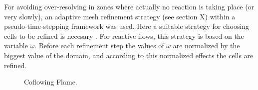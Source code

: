 {For avoiding over-resolving in zones where actually no reaction is taking place (or very slowly), an adaptive mesh refinement strategy  (see section X) within a pseudo-time-stepping framework was used.  Here a  suitable strategy for choosing cells to be refined is necesary . For reactive flows, this strategy is based on the variable $\omega$.
Before each refinement step the values of $\omega$ are normalized by the biggest value of the domain, and according to this normalized effects the cells are refined. %


\begin{figure}
	\centering
	\pgfplotsset{width=0.75 \textwidth, compat=1.3}
	\caption{Coflowing Flame.}
\end{figure}
}
